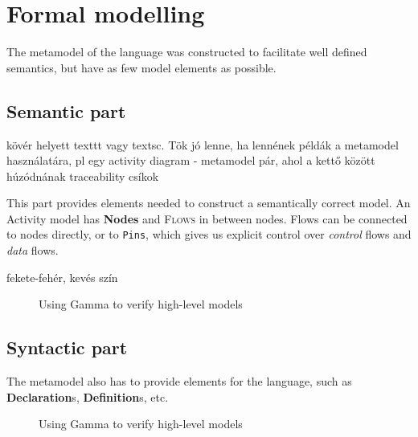 \clearpage\section{Formal modelling}

The metamodel of the language was constructed to facilitate well defined semantics, but have as few model elements as possible.

\subsection{Semantic part}

kövér helyett texttt vagy textsc. Tök jó lenne, ha lennének példák a metamodel használatára, pl egy activity diagram - metamodel pár, ahol a kettő között húzódnának traceability csíkok

This part provides elements needed to construct a semantically correct model. An Activity model has \textbf{Nodes} and \textsc{Flows} in between nodes. Flows can be connected to nodes directly, or to \texttt{Pins}, which gives us explicit control over \emph{control} flows and \emph{data} flows. 

fekete-fehér, kevés szín

\begin{figure}[!ht]
	\centering
	
	\caption{Using Gamma to verify high-level models}
	\label{fig:semantic}
\end{figure}

\subsection{Syntactic part}

The metamodel also has to provide elements for the language, such as \textbf{Declaration}s, \textbf{Definition}s, etc.

\begin{figure}[!ht]
	\centering
	
	\caption{Using Gamma to verify high-level models}
	\label{fig:syntactic}
\end{figure}
